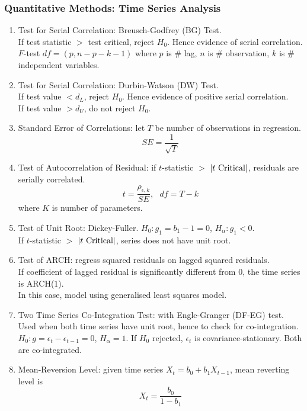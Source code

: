 \subsubsection{Quantitative Methods: Time Series Analysis}

\begin{enumerate}[label=\roman*.]
\setlength{\itemsep}{0pt}
\item Test for Serial Correlation: Breusch-Godfrey (BG) Test.\\
If test statistic $>$ test critical, reject $H_0$. Hence evidence of serial correlation.\\
$F$-test $df = (p, n-p-k-1)$ where $p$ is $\#$ lag, $n$ is $\#$ observation, $k$ is $\#$ independent variables.
\item Test for Serial Correlation: Durbin-Watson (DW) Test.\\
If test value $< d_L$, reject $H_0$. Hence evidence of positive serial correlation.\\
If test value $> d_U$, do not reject $H_0$.
\item Standard Error of Correlations: let $T$ be number of observations in regression.
\begin{equation}
SE = \frac{1}{\sqrt{T}} \nonumber
\end{equation}
\item Test of Autocorrelation of Residual: if $t$-statistic $>$ $\left\lvert t \text{ Critical}\right\rvert$, residuals are serially correlated.
\begin{equation}
t = \frac{\rho_{\epsilon, k}}{SE}, \ \ \ df = T - k \nonumber
\end{equation}
where $K$ is number of parameters.
\item Test of Unit Root: Dickey-Fuller. $H_0: g_1 = b_1 - 1= 0$, $H_{\alpha}: g_1 < 0$.\\
If $t$-statistic $>$ $\left\lvert t \text{ Critical}\right\rvert$, series does not have unit root.
\item Test of ARCH: regress squared residuals on lagged squared residuals.\\
If coefficient of lagged residual is significantly different from $0$, the time series is ARCH($1$).\\
In this case, model using generalised least squares model.
\item Two Time Series Co-Integration Test: with Engle-Granger (DF-EG) test.\\
Used when both time series have unit root, hence to check for co-integration.\\
$H_0: g = \epsilon_t - \epsilon_{t-1} = 0$, $H_{\alpha} = 1$. If $H_0$ rejected, $\epsilon_t$ is covariance-stationary. Both are co-integrated.
\item Mean-Reversion Level: given time series $X_t = b_0 + b_1 X_{t-1}$, mean reverting level is
\begin{equation}
X_t = \frac{b_0}{1 - b_1} \nonumber
\end{equation}
\end{enumerate}

